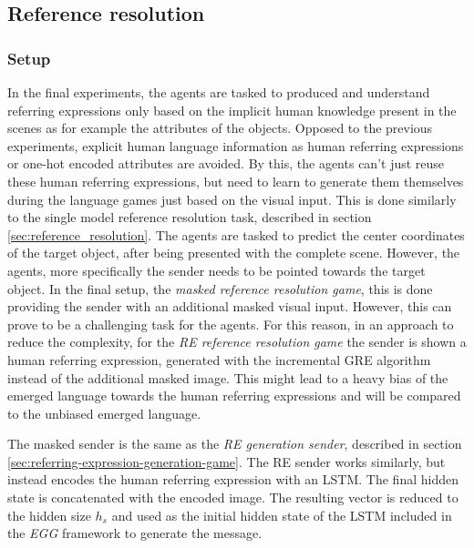 \subsection{Reference resolution}
\subsubsection*{Setup}
In the final experiments, the agents are tasked to produced and understand referring expressions only based on the implicit human knowledge present in the scenes as for example the attributes of the objects.
Opposed to the previous experiments, explicit human language information as human referring expressions or one-hot encoded attributes are avoided.
By this, the agents can't just reuse these human referring expressions, but need to learn to generate them themselves during the language games just based on the visual input.
This is done similarly to the single model reference resolution task, described in section \ref{sec:reference_resolution}.
The agents are tasked to predict the center coordinates of the target object, after being presented with the complete scene.
However, the agents, more specifically the sender needs to be pointed towards the target object.
In the final setup, the \emph{masked reference resolution game}, this is done providing the sender with an additional masked visual input.
However, this can prove to be a challenging task for the agents.
For this reason, in an approach to reduce the complexity, for the \emph{RE reference resolution game} the sender is shown a human referring expression, generated with the incremental GRE algorithm instead of the additional masked image.
This might lead to a heavy bias of the emerged language towards the human referring expressions and will be compared to the unbiased emerged language.

The masked sender is the same as the \emph{RE generation sender}, described in section \ref{sec:referring-expression-generation-game}.
The RE sender works similarly, but instead encodes the human referring expression with an LSTM.
The final hidden state is concatenated with the encoded image.
The resulting vector is reduced to the hidden size $h_s$ and used as the initial hidden state of the LSTM included in the \emph{EGG} framework to generate the message.

